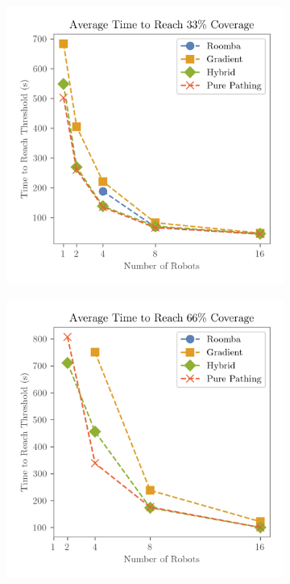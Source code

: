 \def\w{0.329\textwidth}
\begin{figure}[H]
    \centering
    \begin{subfigure}[b]{\w}
        \centering
        \includegraphics[width=\textwidth]{figures/plots/benchmarks/big-coverage-0.33-warehouse.png}
    \end{subfigure}
    \begin{subfigure}[b]{\w}
        \centering
        \includegraphics[width=\textwidth]{figures/plots/benchmarks/big-coverage-0.66-warehouse.png}

\end{subfigure}
\end{figure}
